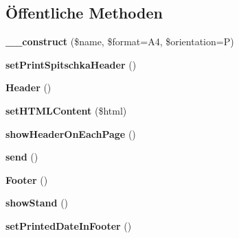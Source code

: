 \subsection*{Öffentliche Methoden}
\begin{DoxyCompactItemize}
\item 
\mbox{\label{class_print_normal_page_a4_with_header_a1c27250e8d698d5a1ac62fdd0af028c9}} 
{\bfseries \+\_\+\+\_\+construct} (\$name, \$format=\textquotesingle{}A4\textquotesingle{}, \$orientation=\textquotesingle{}P\textquotesingle{})
\item 
\mbox{\label{class_print_normal_page_a4_with_header_ab71a4f33e0ae27bc6d2b0b6e95551c6e}} 
{\bfseries set\+Print\+Spitschka\+Header} ()
\item 
\mbox{\label{class_print_normal_page_a4_with_header_a8cdff40b067c3fee42e29db127871c4d}} 
{\bfseries Header} ()
\item 
\mbox{\label{class_print_normal_page_a4_with_header_a8a13d7c6c093b868d5d572a45f3d5024}} 
{\bfseries set\+H\+T\+M\+L\+Content} (\$html)
\item 
\mbox{\label{class_print_normal_page_a4_with_header_a61a49379e8c8150de38f7b018dd7270b}} 
{\bfseries show\+Header\+On\+Each\+Page} ()
\item 
\mbox{\label{class_print_normal_page_a4_with_header_a37f55e04eb55dcf9a80663f864af6173}} 
{\bfseries send} ()
\item 
\mbox{\label{class_print_normal_page_a4_with_header_ad7bb1857ca40d3e92ef45ab8dd87a077}} 
{\bfseries Footer} ()
\item 
\mbox{\label{class_print_normal_page_a4_with_header_a7273cc456b568b472c0c5d35d5470419}} 
{\bfseries show\+Stand} ()
\item 
\mbox{\label{class_print_normal_page_a4_with_header_a5cb90084729c78e39f5d14b93d4bff4f}} 
{\bfseries set\+Printed\+Date\+In\+Footer} ()
\end{DoxyCompactItemize}


